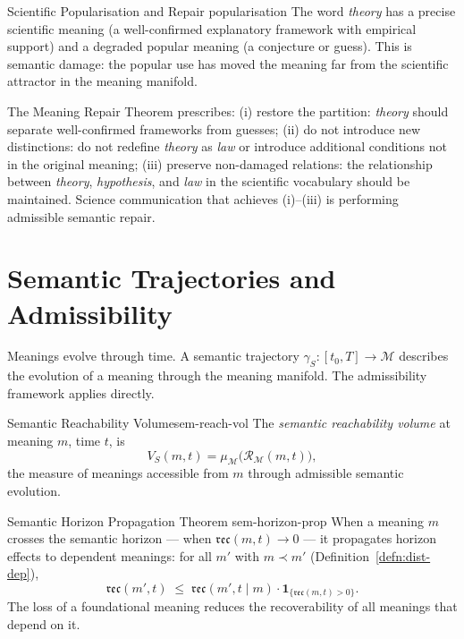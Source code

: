 \documentclass[12pt,twoside,openright]{book}
\newcommand{\reach}{\mathcal{R}}
\newcommand{\reco}{\mathfrak{rec}}
\begin{document}
\begin{example}{Scientific Popularisation and Repair}%
  {popularisation}
  The word \emph{theory} has a precise scientific
  meaning (a well-confirmed explanatory framework
  with empirical support) and a degraded popular
  meaning (a conjecture or guess).
  This is semantic damage: the popular use has moved
  the meaning far from the scientific attractor in
  the meaning manifold.

  The Meaning Repair Theorem prescribes:
  (i) restore the partition: \emph{theory} should
  separate well-confirmed frameworks from guesses;
  (ii) do not introduce new distinctions: do not
  redefine \emph{theory} as \emph{law} or introduce
  additional conditions not in the original meaning;
  (iii) preserve non-damaged relations: the relationship
  between \emph{theory}, \emph{hypothesis}, and
  \emph{law} in the scientific vocabulary should be
  maintained.
  Science communication that achieves (i)--(iii) is
  performing admissible semantic repair.
\end{example}

\section{Semantic Trajectories and Admissibility}

Meanings evolve through time. A semantic trajectory
$\gamma_S : [t_0, T] \to \mathcal{M}$ describes the
evolution of a meaning through the meaning manifold.
The admissibility framework applies directly.

\begin{definition}{Semantic Reachability Volume}{sem-reach-vol}
  The \emph{semantic reachability volume} at meaning $m$,
  time $t$, is
  \[
    V_S(m, t)
    = \mu_\mathcal{M}\!\bigl(\reach_\mathcal{M}(m, t)\bigr),
  \]
  the measure of meanings accessible from $m$ through
  admissible semantic evolution.
\end{definition}

\begin{theorem}{Semantic Horizon Propagation Theorem}%
  {sem-horizon-prop}
  When a meaning $m$ crosses the semantic horizon —
  when $\reco(m, t) \to 0$ — it propagates horizon
  effects to dependent meanings:
  for all $m'$ with $m \prec m'$
  (Definition~\ref{defn:dist-dep}),
  \[
    \reco(m', t)
    \;\le\;
    \reco(m', t \mid m)
    \cdot \mathbf{1}_{\{\reco(m,t)>0\}}.
  \]
  The loss of a foundational meaning reduces the
  recoverability of all meanings that depend on it.
\end{theorem}
\end{document}
